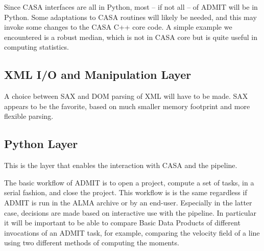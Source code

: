 \documentclass{article}
\begin{document}
Since CASA interfaces are all in Python, most -- if not all -- of
ADMIT will be in Python. Some adaptations to CASA routines will
likely be needed, and this may invoke some changes to the CASA
C++ core code. A simple example we encountered is
a robust median, which is not in CASA core but is quite useful
in computing statistics.

\subsection{XML I/O and Manipulation Layer}

A choice between SAX and DOM parsing of XML will have to be made.
SAX appears to be the favorite, based on much smaller memory
footprint and more flexible parsing.


% 
% 

\subsection{Python Layer}

This is the layer that enables the interaction with
CASA and the pipeline. 


The basic workflow of ADMIT is to open a project, compute a set of tasks,
in a serial fashion, and close the project. This workflow is is the
same regardless if ADMIT is run in the ALMA archive or by an end-user.
Especially in the latter case, decisions are made based on interactive
use with the pipeline. In particular it will be important to be able to
compare Basic Data Products of different invocations of an ADMIT task,
for example, comparing the velocity field of a line using two
different methods of computing the moments.
\end{document}
